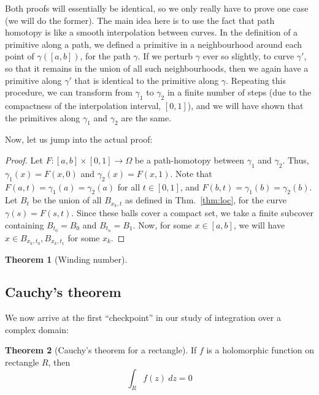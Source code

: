 \documentclass[aps,pra,showpacs,notitlepage,onecolumn,superscriptaddress,nofootinbib]{revtex4-1}
\theoremstyle{definition}
\newtheorem{theorem}{Theorem}[section]
\begin{document}
\noindent Both proofs will essentially be identical, so we only really have to prove one case (we will do the former). The main idea here is to use the fact that path homotopy is like a
smooth interpolation between curves. In the definition of a primitive along a path, we defined a primitive in a neighbourhood around each point of $\gamma([a, b])$, for the path
$\gamma$. If we perturb $\gamma$ ever so slightly, to curve $\gamma'$, so that it remains in the union of all such neighbourhoods, then we again have a primitive along $\gamma'$
that is identical to the primitive along $\gamma$. Repeating this procedure, we can transform from $\gamma_1$ to $\gamma_2$ in a finite number of steps (due to the compactness of the interpolation interval,
$[0, 1]$), and we will have shown that the primitives along $\gamma_1$ and $\gamma_2$ are the same.
\newline

\noindent Now, let us jump into the actual proof:

\begin{proof}

  \noindent Let $F : [a, b] \times [0, 1] \rightarrow \Omega$ be a path-homotopy between $\gamma_1$ and $\gamma_2$. Thus, $\gamma_1(x) = F(x, 0)$ and $\gamma_2(x) = F(x, 1)$.
  Note that $F(a, t) = \gamma_1(a) = \gamma_2(a)$ for all $t \in [0, 1]$, and $F(b, t) = \gamma_1(b) = \gamma_2(b)$. Let $B_{t}$ be the union of all $B_{x_k, t}$ as defined in Thm.~\ref{thm:loc},
  for the curve $\gamma(s) = F(s, t)$. Since these balls cover a compact set, we take a finite subcover containing $B_{t_0} = B_{0}$ and $B_{t_n} = B_{1}$. Now, for some $x \in [a, b]$,
  we will have $x \in B_{x_k, t_0}, B_{x_k, t_1}$ for some $x_k$.
  \end{proof}

\begin{theorem}[Winding number]
\end{theorem}

\subsection{Cauchy's theorem}

\noindent We now arrive at the first ``checkpoint'' in our study of integration over a complex domain:

\begin{theorem}[Cauchy's theorem for a rectangle]
  If $f$ is a holomorphic function on rectangle $R$, then
  \begin{equation}
    \displaystyle\int_{R} f(z) \ dz = 0
    \end{equation}
\end{theorem}
\end{document}
